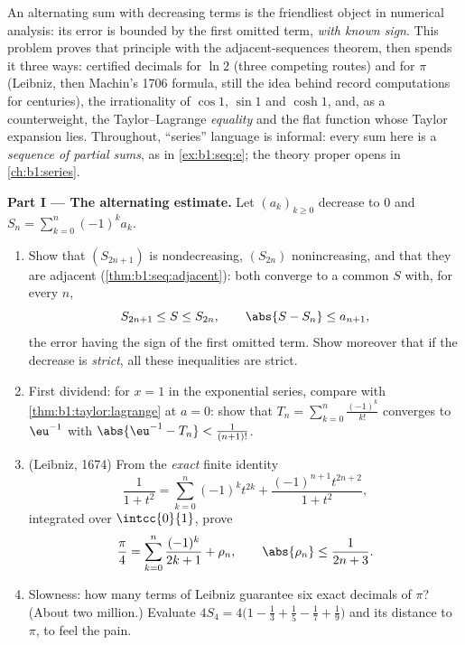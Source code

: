 \begin{problem}
\label{pb:b1:taylor:1}
An alternating sum with decreasing terms is the friendliest
object in numerical analysis: its error is bounded by the first
omitted term, \emph{with known sign}. This problem proves that
principle with the adjacent-sequences theorem, then spends it
three ways: certified decimals for $\ln 2$ (three competing
routes) and for $\pi$ (Leibniz, then Machin's 1706 formula, still
the idea behind record computations for centuries), the
irrationality of $\cos 1$, $\sin 1$ and $\cosh 1$, and, as a
counterweight, the Taylor--Lagrange \emph{equality} and the flat
function whose Taylor expansion lies. Throughout, ``series'' language is informal: every sum
here is a \emph{sequence of partial sums}, as in
\cref{ex:b1:seq:e}; the theory proper opens in
\cref{ch:b1:series}.

\medskip
\noindent\textbf{Part I --- The alternating estimate.} Let
$(a_k)_{k \geq 0}$ decrease to $0$ and $S_n = \sum_{k=0}^{n}
(-1)^k a_k$.
\begin{enumerate}
  \item Show that $(S_{2n+1})$ is nondecreasing, $(S_{2n})$
        nonincreasing, and that they are adjacent
        (\cref{thm:b1:seq:adjacent}): both converge to a common
        $S$ with, for every $n$,
        \[
        S_{2n+1} \leq S \leq S_{2n},
        \qquad
        \abs{S - S_n} \leq a_{n+1} ,
        \]
        the error having the sign of the first omitted term.
        Show moreover that if the decrease is \emph{strict}, all
        these inequalities are strict.
  \item First dividend: for $x = 1$ in the exponential series,
        compare with \cref{thm:b1:taylor:lagrange} at $a = 0$:
        show that $T_n = \sum_{k=0}^{n} \frac{(-1)^k}{k!}$
        converges to $\eu^{-1}$ with $\abs{\eu^{-1} - T_n} <
        \frac{1}{(n+1)!}$.
  \item (Leibniz, 1674) From the \emph{exact} finite identity
        \[
        \frac{1}{1 + t^2} = \sum_{k=0}^{n} (-1)^k t^{2k}
        + \frac{(-1)^{n+1} t^{2n+2}}{1 + t^2} ,
        \]
        integrated over $\intcc{0}{1}$, prove
        \[
        \frac\pi4 = \sum_{k=0}^{n} \frac{(-1)^k}{2k+1} + \rho_n,
        \qquad \abs{\rho_n} \leq \frac{1}{2n+3} .
        \]
  \item Slowness: how many terms of Leibniz guarantee six exact
        decimals of $\pi$? (About two million.) Evaluate $4 S_4
        = 4\bigl(1 - \frac13 + \frac15 - \frac17 +
        \frac19\bigr)$ and its distance to $\pi$, to feel the
        pain.
\end{enumerate}


\end{problem}
